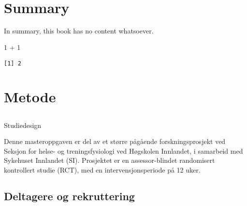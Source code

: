 \documentclass[
  letterpaper,
  DIV=11,
  numbers=noendperiod]{scrreprt}
\newenvironment{Shaded}{\begin{snugshade}}{\end{snugshade}}
\newcommand{\DecValTok}[1]{\textcolor[rgb]{0.68,0.00,0.00}{#1}}
\newcommand{\SpecialCharTok}[1]{\textcolor[rgb]{0.37,0.37,0.37}{#1}}
\begin{document}
\hypertarget{summary}{%
\chapter{Summary}\label{summary}}

In summary, this book has no content whatsoever.

\begin{Shaded}
\begin{Highlighting}[]
\DecValTok{1} \SpecialCharTok{+} \DecValTok{1}
\end{Highlighting}
\end{Shaded}

\begin{verbatim}
[1] 2
\end{verbatim}


\hypertarget{section-1}{%
\chapter{}\label{section-1}}


\hypertarget{section-2}{%
\chapter{}\label{section-2}}


\hypertarget{metode}{%
\chapter{Metode}\label{metode}}

\hypertarget{section-3}{%
\section{}\label{section-3}}

Studiedesign

Denne masteroppgaven er del av et større pågående forskningsprosjekt ved
Seksjon for helse- og treningsfysiologi ved Høgskolen Innlandet, i
samarbeid med Sykehuset Innlandet (SI). Prosjektet er en
assessor-blindet randomisert kontrollert studie (RCT), med en
intervensjonsperiode på 12 uker.

\hypertarget{deltagere-og-rekruttering}{%
\section{Deltagere og rekruttering}\label{deltagere-og-rekruttering}}
\end{document}
